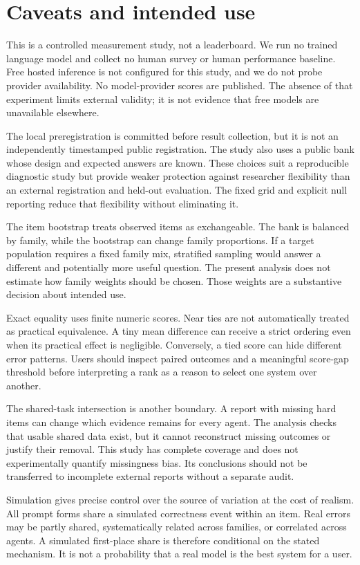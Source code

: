 \documentclass{article}
\begin{document}
\section{Caveats and intended use}
This is a controlled measurement study, not a leaderboard. We run no trained language model and collect no human survey or human performance baseline. Free hosted inference is not configured for this study, and we do not probe provider availability. No model-provider scores are published. The absence of that experiment limits external validity; it is not evidence that free models are unavailable elsewhere.\par
The local preregistration is committed before result collection, but it is not an independently timestamped public registration. The study also uses a public bank whose design and expected answers are known. These choices suit a reproducible diagnostic study but provide weaker protection against researcher flexibility than an external registration and held-out evaluation. The fixed grid and explicit null reporting reduce that flexibility without eliminating it.\par
The item bootstrap treats observed items as exchangeable. The bank is balanced by family, while the bootstrap can change family proportions. If a target population requires a fixed family mix, stratified sampling would answer a different and potentially more useful question. The present analysis does not estimate how family weights should be chosen. Those weights are a substantive decision about intended use.\par
Exact equality uses finite numeric scores. Near ties are not automatically treated as practical equivalence. A tiny mean difference can receive a strict ordering even when its practical effect is negligible. Conversely, a tied score can hide different error patterns. Users should inspect paired outcomes and a meaningful score-gap threshold before interpreting a rank as a reason to select one system over another.\par
The shared-task intersection is another boundary. A report with missing hard items can change which evidence remains for every agent. The analysis checks that usable shared data exist, but it cannot reconstruct missing outcomes or justify their removal. This study has complete coverage and does not experimentally quantify missingness bias. Its conclusions should not be transferred to incomplete external reports without a separate audit.\par
Simulation gives precise control over the source of variation at the cost of realism. All prompt forms share a simulated correctness event within an item. Real errors may be partly shared, systematically related across families, or correlated across agents. A simulated first-place share is therefore conditional on the stated mechanism. It is not a probability that a real model is the best system for a user.\par
\end{document}
